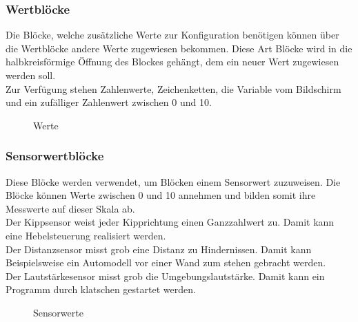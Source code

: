 \subsubsection{Wertblöcke}

Die Blöcke, welche zusätzliche Werte zur Konfiguration benötigen können über die Wertblöcke andere Werte zugewiesen bekommen. Diese Art Blöcke wird in die halbkreisförmige Öffnung des Blockes gehängt, dem ein neuer Wert zugewiesen werden soll. \\
Zur Verfügung stehen Zahlenwerte, Zeichenketten, die Variable vom Bildschirm und ein zufälliger Zahlenwert zwischen 0 und 10.

\begin{figure}[htbp!]
	\centering
	\caption[Werte]{Werte}
	\label{img:Werte}
\end{figure}


\subsubsection{Sensorwertblöcke}

Diese Blöcke werden verwendet, um Blöcken einem Sensorwert zuzuweisen. Die Blöcke können Werte zwischen 0 und 10 annehmen und bilden somit ihre Messwerte auf dieser Skala ab.\\
Der Kippsensor weist jeder Kipprichtung einen Ganzzahlwert zu. Damit kann eine Hebelsteuerung realisiert werden. \\
Der Distanzsensor misst grob eine Distanz zu Hindernissen. Damit kann Beispielsweise ein Automodell vor einer Wand zum stehen gebracht werden.\\
Der Lautstärkesensor misst grob die Umgebungslautstärke. Damit kann ein Programm durch klatschen gestartet werden.

\begin{figure}[H]
	\centering
	\caption[Sensorwerte]{Sensorwerte} %
	\label{img:Sensorwerte}
\end{figure}



